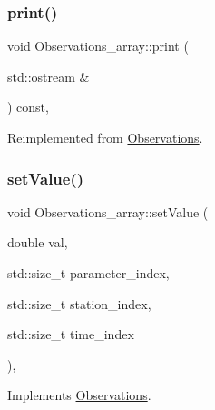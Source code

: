\mbox{\label{class_observations__array_a2563545e5a38ec7e3ec09380c0b38855}} 
\subsubsection{\texorpdfstring{print()}{print()}}
{\footnotesize\ttfamily void Observations\+\_\+array\+::print (\begin{DoxyParamCaption}\item[{std\+::ostream \&}]{ }\end{DoxyParamCaption}) const\hspace{0.3cm}{\ttfamily [override]}, {\ttfamily [virtual]}}



Reimplemented from \mbox{\hyperlink{class_observations_a523647c5ae644959f0ed583cd7b11aba}{Observations}}.

\mbox{\label{class_observations__array_aa6b6e042f8db0afad3beaff248b4a602}} 
\subsubsection{\texorpdfstring{set\+Value()}{setValue()}\hspace{0.1cm}{\footnotesize\ttfamily [1/2]}}
{\footnotesize\ttfamily void Observations\+\_\+array\+::set\+Value (\begin{DoxyParamCaption}\item[{double}]{val,  }\item[{std\+::size\+\_\+t}]{parameter\+\_\+index,  }\item[{std\+::size\+\_\+t}]{station\+\_\+index,  }\item[{std\+::size\+\_\+t}]{time\+\_\+index }\end{DoxyParamCaption})\hspace{0.3cm}{\ttfamily [override]}, {\ttfamily [virtual]}}



Implements \mbox{\hyperlink{class_observations_a6f00b4a2277ce9e77cd0d5975f4066f8}{Observations}}.

\mbox{\label{class_observations__array_a3994f0e11a8207c5e1182a9b20a67ec4}} 
